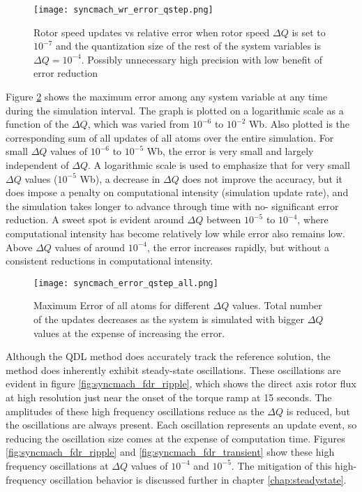 \begin{figure}[h]
    \centering
    \texttt{[image: syncmach\_wr\_error\_qstep.png]}
    \caption{Rotor speed updates vs relative error when rotor speed $\Delta Q$ is set to $10^{-7}$  and the quantization size of the rest of the system variables is $\Delta Q = 10^{-4}$. Possibly unnecessary high precision with low benefit of error reduction}
    \label{fig:syncmach_wr_error_qstep}
\end{figure} 

Figure \ref{fig:syncmach_error_qstep_all} shows the maximum error among any system variable at any time during the simulation interval. The graph is plotted on a logarithmic scale as a function of the $\Delta Q$, which was varied from $10^{-6}$ to $10^{-2}$ Wb. Also plotted is the corresponding sum of all updates of all atoms over the entire simulation. For small $\Delta Q$ values of $10^{-6}$ to $10^{-5}$ Wb, the error is very small and largely independent of $\Delta Q$. A logarithmic scale is used to emphasize that for very small $\Delta Q$ values ($10^{-5}$ Wb), a decrease in $\Delta Q$ does not improve the accuracy, but it does impose a penalty on computational intensity (simulation update rate), and the simulation takes longer to advance through time with no- significant error reduction. A sweet spot is evident around $\Delta Q$ between $10^{-5}$  to $10^{-4}$, where computational intensity has become relatively low while error also remains low. Above $\Delta Q$ values of around $10^{-4}$, the error increases rapidly, but without a consistent reductions in computational intensity.

\begin{figure}[h]
    \centering
    \texttt{[image: syncmach\_error\_qstep\_all.png]}
    \caption{Maximum Error of all atoms for different $\Delta Q$ values. Total number of the updates decreases as the system is simulated with bigger $\Delta Q$ values at the expense of increasing the error.}
    \label{fig:syncmach_error_qstep_all}
\end{figure} 

Although the QDL method does accurately track the reference solution, the method does inherently exhibit steady-state oscillations. These oscillations are evident in figure \ref{fig:syncmach_fdr_ripple}, which shows the direct axis rotor flux at high resolution just near the onset of the torque ramp at 15 seconds. The amplitudes of these high frequency oscillations reduce as the $\Delta Q$ is reduced, but the oscillations are always present. Each oscillation represents an update event, so reducing the oscillation size comes at the expense of computation time. Figures \ref{fig:syncmach_fdr_ripple} and \ref{fig:syncmach_fdr_transient} show these high frequency oscillations at $\Delta Q$ values of $10^{-4}$  and $10^{-5}$. The mitigation of this high-frequency oscillation behavior is discussed further in chapter \ref{chap:steadystate}. 

